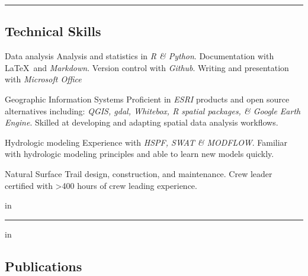 \documentclass[10pt,letterpaper]{article}
\newenvironment{indentsection}[1]%
{\begin{list}{}%
		{\setlength{\leftmargin}{#1}}%
		\item[]%
	}
	{\end{list}}
\begin{document}
	\hrule
	\vspace{-0.4em}
	\subsection*{Technical Skills}
	
	\begin{indentsection}{\parindent}
		\begin{description*}
			\item[Data analysis]
			Analysis and statistics in \textit{R \& Python}. Documentation with \LaTeX\ and \textit{Markdown}. Version control with \textit{Github}. Writing and presentation with \textit{Microsoft Office}
			\item[Geographic Information Systems]
			Proficient in \textit{ESRI} products and open source alternatives including: \textit{QGIS, gdal, Whitebox, R spatial packages, \& Google Earth Engine}. Skilled at developing and adapting spatial data analysis workflows.
			\item[Hydrologic modeling]
			Experience with \textit{HSPF, SWAT \& MODFLOW}. Familiar with hydrologic modeling principles and able to learn new models quickly.
			\item[Natural Surface Trail] design, construction, and maintenance. Crew leader certified with >400 hours of crew leading experience.
		\end{description*}
	\end{indentsection}
	
	\vspace{-0.4em}
	 in
	
	\hrule
	\vspace{-0.4em}
	 in
	\subsection*{Publications}
	
\end{document}
